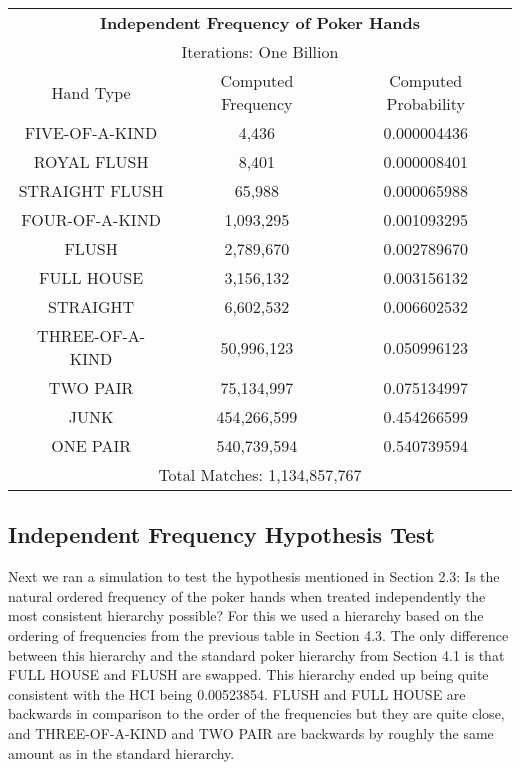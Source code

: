 \documentclass[16pt]{article}
\begin{document}
\begin{center}
\begin{tabular}{ |c c c|} 
\hline
\multicolumn{3}{|c|}{\textbf{Independent Frequency of Poker Hands}} \\
\multicolumn{3}{|c|}{Iterations: One Billion} \\
 \hline
 Hand Type & Computed Frequency & Computed Probability \\ 
 \hline
 FIVE-OF-A-KIND & 4,436 & 0.000004436\\ 
 ROYAL FLUSH & 8,401 & 0.000008401\\ 
 STRAIGHT FLUSH & 65,988 & 0.000065988\\
 FOUR-OF-A-KIND & 1,093,295 & 0.001093295\\
 FLUSH & 2,789,670 & 0.002789670\\
 FULL HOUSE & 3,156,132 & 0.003156132\\
 STRAIGHT & 6,602,532 & 0.006602532\\
 THREE-OF-A-KIND & 50,996,123 & 0.050996123\\
 TWO PAIR & 75,134,997 & 0.075134997\\
 JUNK & 454,266,599 & 0.454266599\\
 ONE PAIR & 540,739,594 & 0.540739594\\
 \hline
 \multicolumn{3}{|c|}{Total Matches: 1,134,857,767} \\
 \hline
\end{tabular}
\end{center}

\subsection{\textbf{Independent Frequency Hypothesis Test}}
Next we ran a simulation to test the hypothesis mentioned in Section 2.3: Is the natural ordered frequency of the poker hands when treated independently the most consistent hierarchy possible? For this we used a hierarchy based on the ordering of frequencies from the previous table in Section 4.3. The only difference between this hierarchy and the standard poker hierarchy from Section 4.1 is that FULL HOUSE and FLUSH are swapped. This hierarchy ended up being quite consistent with the HCI being 0.00523854. FLUSH and FULL HOUSE are backwards in comparison to the order of the frequencies but they are quite close, and THREE-OF-A-KIND and TWO PAIR are backwards by roughly the same amount as in the standard hierarchy.
\end{document}
